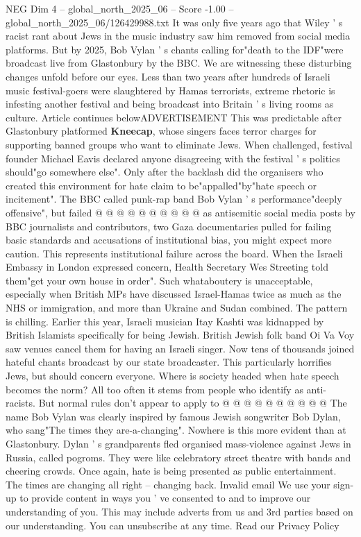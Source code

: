 \begin{textsample}{NEG Dim 4 – global\_north\_2025\_06 – Score -1.00 – global\_north\_2025\_06/126429988.txt}  \label{ex:f4_neg_071}
It was only five years ago that Wiley ' s racist rant about Jews in the music industry saw him removed from social media platforms.
But by 2025, Bob Vylan ' s chants calling for"death to the IDF"were broadcast live from Glastonbury by the BBC.
We are witnessing these disturbing changes unfold before our eyes.
Less than two years after hundreds of Israeli music festival-goers were slaughtered by Hamas terrorists, extreme rhetoric is infesting another festival and being broadcast into Britain ' s living rooms as culture.
Article continues belowADVERTISEMENT This was predictable after Glastonbury platformed \textbf{Kneecap}, whose singers faces terror charges for supporting banned groups who want to eliminate Jews.
When challenged, festival founder Michael Eavis declared anyone disagreeing with the festival ' s politics should"go somewhere else".
Only after the backlash did the organisers who created this environment for hate claim to be"appalled"by"hate speech or incitement".
The BBC called punk-rap band Bob Vylan ' s performance"deeply offensive", but failed @ @ @ @ @ @ @ @ @ @ as antisemitic social media posts by BBC journalists and contributors, two Gaza documentaries pulled for failing basic standards and accusations of institutional bias, you might expect more caution.
This represents institutional failure across the board.
When the Israeli Embassy in London expressed concern, Health Secretary Wes Streeting told them"get your own house in order".
Such whataboutery is unacceptable, especially when British MPs have discussed Israel-Hamas twice as much as the NHS or immigration, and more than Ukraine and Sudan combined.
The pattern is chilling.
Earlier this year, Israeli musician Itay Kashti was kidnapped by British Islamists specifically for being Jewish.
British Jewish folk band Oi Va Voy saw venues cancel them for having an Israeli singer.
Now tens of thousands joined hateful chants broadcast by our state broadcaster.
This particularly horrifies Jews, but should concern everyone.
Where is society headed when hate speech becomes the norm?
All too often it stems from people who identify as anti-racists.
But normal rules don't appear to apply to @ @ @ @ @ @ @ @ @ @ The name Bob Vylan was clearly inspired by famous Jewish songwriter Bob Dylan, who sang"The times they are-a-changing".
Nowhere is this more evident than at Glastonbury.
Dylan ' s grandparents fled organised mass-violence against Jews in Russia, called pogroms.
They were like celebratory street theatre with bands and cheering crowds.
Once again, hate is being presented as public entertainment.
The times are changing all right -- changing back.
Invalid email We use your sign-up to provide content in ways you ' ve consented to and to improve our understanding of you.
This may include adverts from us and 3rd parties based on our understanding.
You can unsubscribe at any time.
Read our Privacy Policy

\end{textsample}
